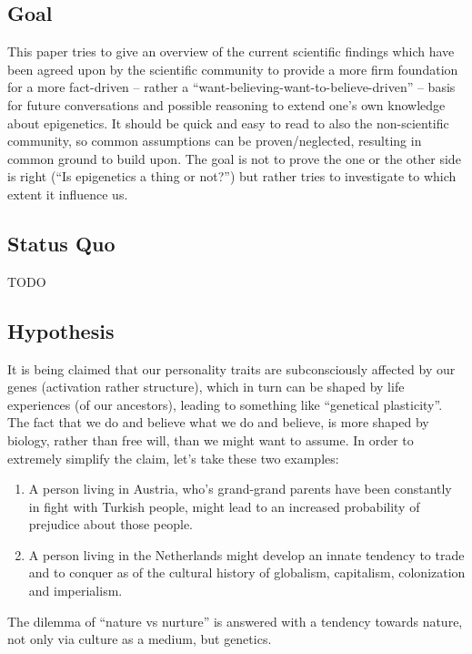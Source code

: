 \documentclass[11pt,twocolumn]{article}
\begin{document}
\subsection{Goal}

This paper tries to give an overview of the current scientific findings which have been agreed upon by the scientific community to provide a more firm foundation for a more fact-driven -- rather a ``want-believing-want-to-believe-driven'' -- basis for future conversations and possible reasoning to extend one's own knowledge about epigenetics. It should be quick and easy to read to also the non-scientific community, so common assumptions can be proven/neglected, resulting in common ground to build upon. The goal is not to prove the one or the other side is right (``Is epigenetics a thing or not?'') but rather tries to investigate to which extent it influence us.

\subsection{Status Quo}

TODO %

\subsection{Hypothesis}

It is being claimed that our personality traits are subconsciously affected by our genes (activation rather structure), which in turn can be shaped by life experiences (of our ancestors), leading to something like ``genetical plasticity''. The fact that we do and believe what we do and believe, is more shaped by biology, rather than free will, than we might want to assume. In order to extremely simplify the claim, let's take these two examples:

\begin{enumerate}[label=\alph*)]
	\item A person living in Austria, who's grand-grand parents have been constantly in fight with Turkish people, might lead to an increased probability of prejudice about those people.
	\item A person living in the Netherlands might develop an innate tendency to trade and to conquer as of the cultural history of globalism, capitalism, colonization and imperialism.
\end{enumerate}

The dilemma of ``nature vs nurture'' is answered with a tendency towards nature, not only via culture as a medium, but genetics.
\end{document}
